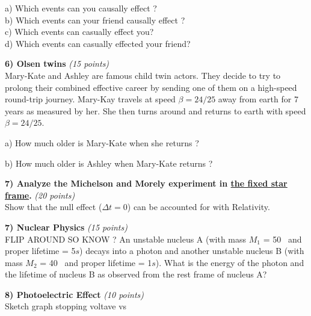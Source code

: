 {\vspace{0.1in}

a) Which events can you causally effect ?\\

b) Which events can your friend causally effect ?\\

c) Which events can casually effect you?\\

d) Which events can casually effected your friend?

%
\clearpage

\textbf{6) Olsen twins}  \hfill \textit{(15 points)}\\
Mary-Kate and Ashley are famous child twin actors.
They decide to try to prolong their combined effective career by sending one of them on a high-speed round-trip journey. 
Mary-Kay travels at speed $\beta = 24/25$ away from earth for 7 years as measured by her.
She then turns around and returns to earth with speed $\beta = 24/25$.

a) How much older is Mary-Kate when she returns ?

b) How much older is Ashley when Mary-Kate returns ?


\clearpage

\textbf{7) Analyze the Michelson and Morely experiment in \underline{the fixed star frame}.}  \hfill \textit{(20 points)}\\
Show that the null effect  ($\Delta t = 0$) can be accounted for with Relativity.



\textbf{7) Nuclear Physics }\hfill \textit{(15 points)}\\
FLIP AROUND SO KNOW ?
An unstable nucleus A (with mass $M_1$ = 50 \GeV\ and proper lifetime = 5$s$) decays into a photon and another unstable nucleus B (with mass $M_2$ = 40 \GeV\ and proper lifetime = 1$s$).
What is the energy of the photon and the lifetime of nucleus B as observed from the rest frame of nucleus A?

\textbf{8) Photoelectric Effect }\hfill \textit{(10 points)}\\
Sketch graph stopping voltave vs

}
